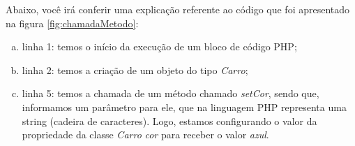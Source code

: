 \FloatBarrier 	%

Abaixo, você irá conferir uma explicação referente ao código que foi
apresentado na figura \ref{fig:chamadaMetodo}:

\begin{enumerate}[a)]
    \item linha 1: temos o início da execução de um bloco de código
    PHP;
    \item linha 2: temos a criação de um objeto do tipo \textit{Carro};
    \item linha 5: temos a chamada de um método chamado
    \textit{setCor}, sendo que, informamos um parâmetro para ele, que na 
    linguagem PHP representa uma string (cadeira de caracteres). Logo, estamos 
    configurando o valor da propriedade da classe \textit{Carro} \textit{cor}
    para receber o valor \textit{azul}.
\end{enumerate}